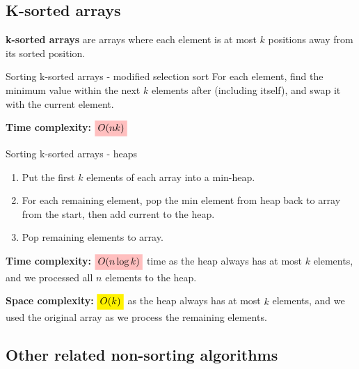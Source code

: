 \subsection{K-sorted arrays}

\textbf{k-sorted arrays} are arrays where each element is at most $k$ positions away from its sorted position.

\begin{knBox}
    {Sorting k-sorted arrays - modified selection sort}
    For each element, find the minimum value within the next $k$ elements after (including itself), and swap it with the current element.

    \textbf{Time complexity: } $\mathcolorbox{pink}{O(nk)}$
\end{knBox}

\begin{knBox}
    {Sorting k-sorted arrays - heaps}
    \begin{enumerate}
        \item Put the first $k$ elements of each array into a min-heap.
        \item For each remaining element, pop the min element from heap back to array from the start, then add current to the heap.
        \item Pop remaining elements to array.
    \end{enumerate}

    \textbf{Time complexity: } $\mathcolorbox{pink}{O(n\log k)}$ time as the heap always has at most $k$ elements, and we processed all $n$ elements to the heap.

    \textbf{Space complexity: } $\mathcolorbox{yellow}{O(k)}$ as the heap always has at most $k$ elements, and we used the original array as we process the remaining elements.
\end{knBox}

\subsection{Other related non-sorting algorithms}

